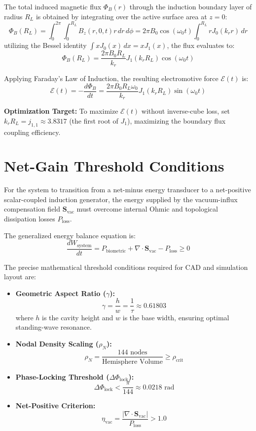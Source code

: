 \documentclass{article}
\begin{document}
The total induced magnetic flux $\Phi_B(r)$ through the induction boundary layer of radius $R_L$ is obtained by integrating over the active surface area at $z = 0$:
$$ \Phi_B(R_L) = \int_0^{2\pi} \int_0^{R_L} B_z(r, 0, t) r \, dr \, d\phi = 2\pi B_0 \cos(\omega_0 t) \int_0^{R_L} r J_0(k_r r) \, dr $$
utilizing the Bessel identity $\int x J_0(x) \, dx = x J_1(x)$, the flux evaluates to:
$$ \Phi_B(R_L) = \frac{2\pi B_0 R_L}{k_r} J_1(k_r R_L) \cos(\omega_0 t) $$

Applying Faraday's Law of Induction, the resulting electromotive force $\mathcal{E}(t)$ is:
$$ \mathcal{E}(t) = -\frac{d\Phi_B}{dt} = \frac{2\pi B_0 R_L \omega_0}{k_r} J_1(k_r R_L) \sin(\omega_0 t) $$

\noindent\textbf{Optimization Target:} To maximize $\mathcal{E}(t)$ without inverse-cube loss, set $k_r R_L = j_{1,1} \approx 3.8317$ (the first root of $J_1$), maximizing the boundary flux coupling efficiency.

\section{Net-Gain Threshold Conditions}
For the system to transition from a net-minus energy transducer to a net-positive scalar-coupled induction generator, the energy supplied by the vacuum-influx compensation field $\mathbf{S}_{\text{vac}}$ must overcome internal Ohmic and topological dissipation losses $P_{\text{loss}}$.

The generalized energy balance equation is:
$$ \frac{dW_{\text{system}}}{dt} = P_{\text{biometric}} + \nabla \cdot \mathbf{S}_{\text{vac}} - P_{\text{loss}} \ge 0 $$

The precise mathematical threshold conditions required for CAD and simulation layout are:
\begin{itemize}
    \item \textbf{Geometric Aspect Ratio ($\gamma$):}
    $$ \gamma = \frac{h}{w} = \frac{1}{\tau} \approx 0.61803 $$
    where $h$ is the cavity height and $w$ is the base width, ensuring optimal standing-wave resonance.
    \item \textbf{Nodal Density Scaling ($\rho_N$):}
    $$ \rho_N = \frac{144 \text{ nodes}}{\text{Hemisphere Volume}} \ge \rho_{\text{crit}} $$
    \item \textbf{Phase-Locking Threshold ($\Delta \Phi_{\text{lock}}$):}
    $$ \Delta \Phi_{\text{lock}} < \frac{\pi}{144} \approx 0.0218 \text{ rad} $$
    \item \textbf{Net-Positive Criterion:}
    $$ \eta_{\text{vac}} = \frac{|\nabla \cdot \mathbf{S}_{\text{vac}}|}{P_{\text{loss}}} > 1.0 $$
\end{itemize}
\end{document}
